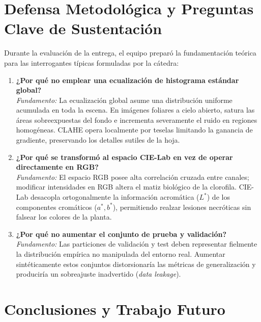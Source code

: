 \documentclass[12pt,a4paper]{article}
\begin{document}
\section{Defensa Metodológica y Preguntas Clave de Sustentación}

Durante la evaluación de la entrega, el equipo preparó la fundamentación teórica para las interrogantes típicas formuladas por la cátedra:

\begin{enumerate}
    \item \textbf{¿Por qué no emplear una ecualización de histograma estándar global?} \\
    \textit{Fundamento:} La ecualización global asume una distribución uniforme acumulada en toda la escena. En imágenes foliares a cielo abierto, satura las áreas sobreexpuestas del fondo e incrementa severamente el ruido en regiones homogéneas. CLAHE opera localmente por teselas limitando la ganancia de gradiente, preservando los detalles sutiles de la hoja.
    
    \item \textbf{¿Por qué se transformó al espacio CIE-Lab en vez de operar directamente en RGB?} \\
    \textit{Fundamento:} El espacio RGB posee alta correlación cruzada entre canales; modificar intensidades en RGB altera el matiz biológico de la clorofila. CIE-Lab desacopla ortogonalmente la información acromática ($L^*$) de los componentes cromáticos ($a^*, b^*$), permitiendo realzar lesiones necróticas sin falsear los colores de la planta.
    
    \item \textbf{¿Por qué no aumentar el conjunto de prueba y validación?} \\
    \textit{Fundamento:} Las particiones de validación y test deben representar fielmente la distribución empírica no manipulada del entorno real. Aumentar sintéticamente estos conjuntos distorsionaría las métricas de generalización y produciría un sobreajuste inadvertido (\textit{data leakage}).
\end{enumerate}

\section{Conclusiones y Trabajo Futuro}
\end{document}
